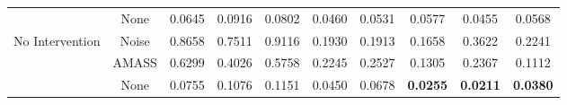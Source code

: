 \begin{table*}[t]
\begin{tabular}{c|c|ccc|cc|ccc}
                                      & None                                 & 0.0645          & 0.0916          & 0.0802          & 0.0460          & 0.0531          & 0.0577          & 0.0455          & 0.0568          \\ \cmidrule{1-10}
\multirow{3}{*}{No Intervention}                 & Noise                        & 0.8658          & 0.7511          & 0.9116          & 0.1930          & 0.1913          & 0.1658          & 0.3622          & 0.2241          \\
                                      & AMASS                                & 0.6299          & 0.4026          & 0.5758          & 0.2245          & 0.2527          & 0.1305          & 0.2367          & 0.1112          \\
                                      & None                                 & 0.0755          & 0.1076          & 0.1151          & 0.0450          & 0.0678          & \textbf{0.0255} & \textbf{0.0211} & \textbf{0.0380} \\ \bottomrule
\end{tabular}
\end{table*}


